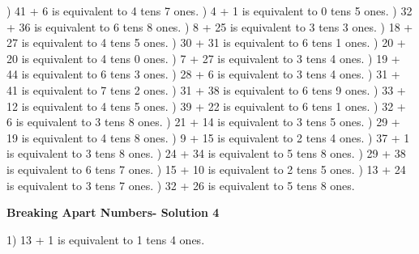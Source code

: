 \documentclass{article}%
\begin{document}
) 41 + 6 is equivalent to 4 tens 7 ones.%
) 4 + 1 is equivalent to 0 tens 5 ones.%
) 32 + 36 is equivalent to 6 tens 8 ones.%
) 8 + 25 is equivalent to 3 tens 3 ones.%
) 18 + 27 is equivalent to 4 tens 5 ones.%
) 30 + 31 is equivalent to 6 tens 1 ones.%
) 20 + 20 is equivalent to 4 tens 0 ones.%
) 7 + 27 is equivalent to 3 tens 4 ones.%
) 19 + 44 is equivalent to 6 tens 3 ones.%
) 28 + 6 is equivalent to 3 tens 4 ones.%
) 31 + 41 is equivalent to 7 tens 2 ones.%
) 31 + 38 is equivalent to 6 tens 9 ones.%
) 33 + 12 is equivalent to 4 tens 5 ones.%
) 39 + 22 is equivalent to 6 tens 1 ones.%
) 32 + 6 is equivalent to 3 tens 8 ones.%
) 21 + 14 is equivalent to 3 tens 5 ones.%
) 29 + 19 is equivalent to 4 tens 8 ones.%
) 9 + 15 is equivalent to 2 tens 4 ones.%
) 37 + 1 is equivalent to 3 tens 8 ones.%
) 24 + 34 is equivalent to 5 tens 8 ones.%
) 29 + 38 is equivalent to 6 tens 7 ones.%
) 15 + 10 is equivalent to 2 tens 5 ones.%
) 13 + 24 is equivalent to 3 tens 7 ones.%
) 32 + 26 is equivalent to 5 tens 8 ones.%
\newline%
\newpage%
\large%
\begin{center}%
\textbf{Breaking Apart Numbers- Solution 4}%
\newline%
\end{center} \normalsize%
1) 13 + 1 is equivalent to 1 tens 4 ones.%
\newline%
\end{document}
